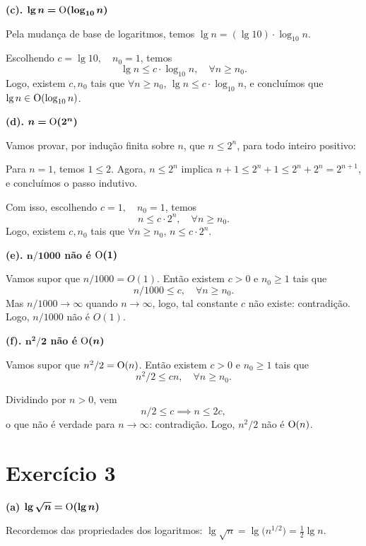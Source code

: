 \documentclass[a4paper]{article}
\begin{document}
\bigskip

\textbf{(c). $\bm{\lg n = \text O(\log_{10} n)}$}

Pela mudança de base de logaritmos, temos $\lg n = (\lg 10) \cdot \log_{10} n$.

Escolhendo $c = \lg 10, \quad n_0 = 1$, temos
\[ \lg n \le c \cdot \log_{10} n, \quad \forall n \ge n_0. \]
Logo, existem $c, n_0$ tais que $\forall n \geq n_0$, $\lg n \leq c \cdot \log_{10} n$, e concluímos que $\lg n \in \text O(\log_{10} n)$.

\bigskip

\textbf{(d). $\bm{n = \text O(2^n)}$}

Vamos provar, por indução finita sobre $n$, que $n \le 2^n$, para todo inteiro positivo:

Para $n=1$, temos $1 \leq 2$. Agora, $n \le 2^n$ implica $n+1 \le 2^n + 1 \le 2^n + 2^n = 2^{n+1}$, e concluímos o passo indutivo.

Com isso, escolhendo $c = 1, \quad n_0 = 1$, temos
\[ n \le c \cdot 2^n, \quad \forall n \ge n_0. \]
Logo, existem $c, n_0$ tais que $\forall n \geq n_0$, $n \le c \cdot 2^n$.

\bigskip

\textbf{(e). $\bm{n/1000}$ não é $\bm{\text O(1)}$}

Vamos supor que $n/1000 = O(1)$. Então existem $c>0$ e $n_0 \ge 1$ tais que
\[ n/1000 \le c, \quad \forall n \ge n_0. \]
Mas $n/1000 \to \infty$ quando $n \to \infty$, logo, tal constante $c$ não existe: contradição. Logo, $n/1000$ não é $O(1)$.

\bigskip

\textbf{(f). $\bm{n^2/2}$ não é $\text O \bm{(n)}$}

Vamos supor que $n^2/2 = \text O(n)$. Então existem $c>0$ e $n_0 \ge 1$ tais que
\[ n^2/2 \le c n, \quad \forall n \ge n_0. \]

Dividindo por $n > 0$, vem
\[ n/2 \le c \implies n \le 2c, \]
o que não é verdade para $n \to \infty$: contradição. Logo, $n^2/2$ não é $\text O(n)$.

\newpage

\section*{Exercício 3}

\textbf{(a) $\bm{\lg\sqrt{n} = \text O(\lg n)}$}

Recordemos das propriedades dos logaritmos: $\lg\sqrt{n}=\lg\big(n^{1/2}\big)=\tfrac{1}{2}\lg n.$
\end{document}
